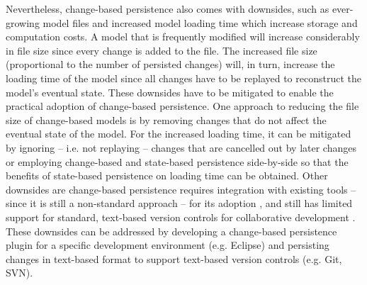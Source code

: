 Nevertheless, change-based persistence also comes with downsides, such as ever-growing model files 
\cite{DBLP:journals/entcs/RobbesL07,DBLP:conf/edoc/KoegelHLHD10} and increased model loading time \cite{mens2002state}
which increase storage and computation costs. A model that is frequently modified will increase considerably in file size 
since every change is added to the file. The increased file size (proportional to the number of persisted changes) will, 
in turn, increase the loading time of the model since all changes have to be replayed to reconstruct the model's 
eventual state. These downsides have to be mitigated to enable the practical adoption of change-based persistence. 
One approach to reducing the file size of change-based models is by removing changes that do not affect the eventual 
state of the model. For the increased loading time, it can be mitigated by ignoring -- i.e. not replaying -- changes 
that are cancelled out by later changes or employing change-based and state-based persistence side-by-side so that the
benefits of state-based persistence on loading time can be obtained. Other downsides are change-based persistence requires 
integration with existing tools -- since it is still a non-standard approach -- for its adoption \cite{koegel2010emfstore}, 
and still has limited support for standard, text-based version controls for collaborative development \cite{koegel2010emfstore}. 
These downsides can be addressed by developing a change-based persistence plugin for a specific development environment 
(e.g. Eclipse) and persisting changes in text-based format to support text-based version controls (e.g. Git, SVN).


